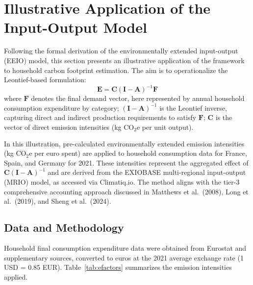 \documentclass[12pt,a4paper]{article}%
\begin{document}
\section{Illustrative Application of the Input-Output Model}

Following the formal derivation of the environmentally extended input-output (EEIO) model, this section presents an illustrative application of the framework to household carbon footprint estimation. The aim is to operationalize the Leontief-based formulation:
\[
\mathbf{E} = \mathbf{C} (\mathbf{I}-\mathbf{A})^{-1} \mathbf{F}
\]
where $\mathbf{F}$ denotes the final demand vector, here represented by annual household consumption expenditure by category; ${(\mathbf{I}-\mathbf{A})}^{-1}$ is the Leontief inverse, capturing direct and indirect production requirements to satisfy $\mathbf{F}$; $\mathbf{C}$ is the vector of direct emission intensities (kg CO$_{2}$e per unit output).

In this illustration, pre-calculated environmentally extended emission intensities (kg CO$_{2}$e per euro spent) are applied to household consumption data for France, Spain, and Germany for 2021. These intensities represent the aggregated effect of $\mathbf{C} {(\mathbf{I}-\mathbf{A})}^{-1}$ and are derived from the EXIOBASE multi-regional input-output (MRIO) model, as accessed via Climatiq.io. The method aligns with the tier-3 comprehensive accounting approach discussed in Matthews et al.~(2008), Long et al.~(2019), and Sheng et al.~(2024).

\subsection{Data and Methodology}

Household final consumption expenditure data were obtained from Eurostat and supplementary sources, converted to euros at the 2021 average exchange rate (1 USD = 0.85 EUR). Table~\ref{tab:efactors} summarizes the emission intensities applied.
\end{document}
